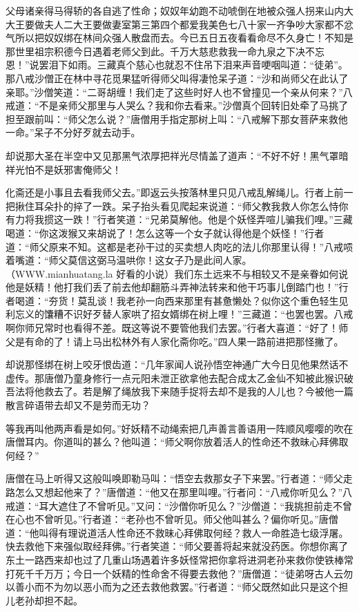 \documentclass[12pt,UTF8]{ctexbook}
\begin{document}
{	父母诸亲得马得轿的各自逃了性命；奴奴年幼跑不动唬倒在地被众强人拐来山内大大王要做夫人二大王要做妻室第三第四个都爱我美色七八十家一齐争吵大家都不忿气所以把奴奴绑在林间众强人散盘而去。今已五日五夜看看命尽不久身亡！不知是那世里祖宗积德今日遇着老师父到此。千万大慈悲救我一命九泉之下决不忘恩！”说罢泪下如雨。三藏真个慈心也就忍不住吊下泪来声音哽咽叫道：“徒弟”。那八戒沙僧正在林中寻花觅果猛听得师父叫得凄怆呆子道：“沙和尚师父在此认了亲耶。”沙僧笑道：“二哥胡缠！我们走了这些时好人也不曾撞见一个亲从何来？”八戒道：“不是亲师父那里与人哭么？我和你去看来。”沙僧真个回转旧处牵了马挑了担至跟前叫：“师父怎么说？”唐僧用手指定那树上叫：“八戒解下那女菩萨来救他一命。”呆子不分好歹就去动手。
	
	却说那大圣在半空中又见那黑气浓厚把祥光尽情盖了道声：“不好不好！黑气罩暗祥光怕不是妖邪害俺师父！
	
	化斋还是小事且去看我师父去。”即返云头按落林里只见八戒乱解绳儿。行者上前一把揪住耳朵扑的捽了一跌。呆子抬头看见爬起来说道：“师父教我救人你怎么恃你有力将我掼这一跌！”行者笑道：“兄弟莫解他。他是个妖怪弄喧儿骗我们哩。”三藏喝道：“你这泼猴又来胡说了！怎么这等一个女子就认得他是个妖怪！”行者道：“师父原来不知。这都是老孙干过的买卖想人肉吃的法儿你那里认得！”八戒唝着嘴道：“师父莫信这弼马温哄你！这女子乃是此间人家。（WWW.mianhuatang.la 好看的小说）我们东土远来不与相较又不是亲眷如何说他是妖精！他打我们丢了前去他却翻筋斗弄神法转来和他干巧事儿倒踏门也！”行者喝道：“夯货！莫乱谈！我老孙一向西来那里有甚惫懒处？似你这个重色轻生见利忘义的馕糟不识好歹替人家哄了招女婿绑在树上哩！”三藏道：“也罢也罢。八戒啊你师兄常时也看得不差。既这等说不要管他我们去罢。”行者大喜道：“好了！师父是有命的了！请上马出松林外有人家化斋你吃。”四人果一路前进把那怪撇了。
	
	却说那怪绑在树上咬牙恨齿道：“几年家闻人说孙悟空神通广大今日见他果然话不虚传。那唐僧乃童身修行一点元阳未泄正欲拿他去配合成太乙金仙不知被此猴识破吾法将他救去了。若是解了绳放我下来随手捉将去却不是我的人儿也？今被他一篇散言碎语带去却又不是劳而无功？
	
	等我再叫他两声看是如何。”好妖精不动绳索把几声善言善语用一阵顺风嘤嘤的吹在唐僧耳内。你道叫的甚么？他叫道：“师父啊你放着活人的性命还不救昧心拜佛取何经？”
	
	唐僧在马上听得又这般叫唤即勒马叫：“悟空去救那女子下来罢。”行者道：“师父走路怎么又想起他来了？”唐僧道：“他又在那里叫哩。”行者问：“八戒你听见么？”八戒道：“耳大遮住了不曾听见。”又问：“沙僧你听见么？”沙僧道：“我挑担前走不曾在心也不曾听见。”行者道：“老孙也不曾听见。师父他叫甚么？偏你听见。”唐僧道：“他叫得有理说道活人性命还不救昧心拜佛取何经？救人一命胜造七级浮屠。快去救他下来强似取经拜佛。”行者笑道：“师父要善将起来就没药医。你想你离了东土一路西来却也过了几重山场遇着许多妖怪常把你拿将进洞老孙来救你使铁棒常打死千千万万；今日一个妖精的性命舍不得要去救他？”唐僧道：“徒弟呀古人云勿以善小而不为勿以恶小而为之还去救他救罢。”行者道：“师父既然如此只是这个担儿老孙却担不起。
	
}
\end{document}
